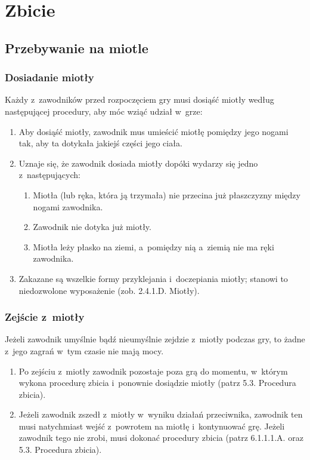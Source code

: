\documentclass[12pt,a4paper]{article}
\begin{document}
\pagebreak
\section{Zbicie}

\subsection{Przebywanie na miotle}

\subsubsection{Dosiadanie miotły}

Każdy z~zawodników przed rozpoczęciem gry musi dosiąść miotły według
następującej procedury, aby móc wziąć udział w~grze:

\begin{enumerate}
	\item
	      Aby dosiąść miotły, zawodnik mus umieścić miotłę pomiędzy jego nogami
	      tak, aby ta dotykała jakiejś części jego ciała.
	\item
	      Uznaje się, że zawodnik dosiada miotły dopóki wydarzy się jedno z~następujących:

	      \begin{enumerate}
		      \item
		            Miotła (lub ręka, która ją trzymała) nie przecina już płaszczyzny
		            między nogami zawodnika.
		      \item
		            Zawodnik nie dotyka już miotły.
		      \item
		            Miotła leży płasko na ziemi, a~pomiędzy nią a~ziemią nie ma ręki
		            zawodnika.
	      \end{enumerate}
	\item
	      Zakazane są wszelkie formy przyklejania i~doczepiania miotły; stanowi
	      to niedozwolone wyposażenie (zob. 2.4.1.D. Miotły).
\end{enumerate}

\subsubsection{Zejście z~miotły}

Jeżeli zawodnik umyślnie bądź nieumyślnie zejdzie z~miotły podczas gry,
to żadne z~jego zagrań w~tym czasie nie mają mocy.

\begin{enumerate}
	\item
	      Po zejściu z~miotły zawodnik pozostaje poza grą do momentu, w~którym
	      wykona procedurę zbicia i~ponownie dosiądzie miotły (patrz 5.3.
	      Procedura zbicia).
	\item
	      Jeżeli zawodnik zszedł z~miotły w~wyniku działań przeciwnika, zawodnik
	      ten musi natychmiast wejść z~powrotem na miotłę i~kontynuować grę.
	      Jeżeli zawodnik tego nie zrobi, musi dokonać procedury zbicia (patrz
	      6.1.1.1.A. oraz 5.3. Procedura zbicia).
\end{enumerate}
\end{document}
